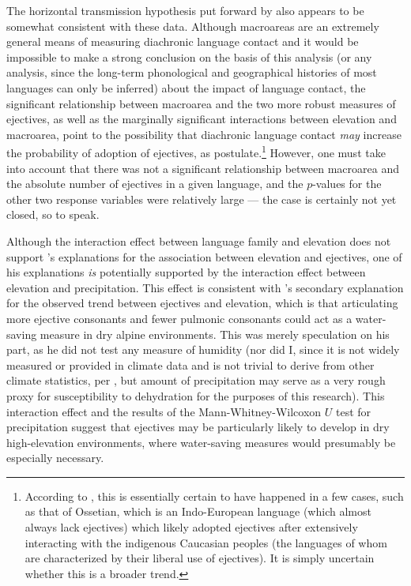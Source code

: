 \documentclass{article}
\begin{document}
The horizontal transmission hypothesis put forward by \textcite{urban2021} also appears to be somewhat consistent with these data. Although macroareas are an extremely general means of measuring diachronic language contact and it would be impossible to make a strong conclusion on the basis of this analysis (or any analysis, since the long-term phonological and geographical histories of most languages can only be inferred) about the impact of language contact, the significant relationship between macroarea and the two more robust measures of ejectives, as well as the marginally significant interactions between elevation and macroarea, point to the possibility that diachronic language contact \emph{may} increase the probability of adoption of ejectives, as \textcite{urban2021} postulate.\footnote{According to \textcite{urban2021}, this is essentially certain to have happened in a few cases, such as that of Ossetian, which is an Indo-European language (which almost always lack ejectives) which likely adopted ejectives after extensively interacting with the indigenous Caucasian peoples (the languages of whom are characterized by their liberal use of ejectives). It is simply uncertain whether this is a broader trend.} However, one must take into account that there was not a significant relationship between macroarea and the absolute number of ejectives in a given language, and the $p$-values for the other two response variables were relatively large --- the case is certainly not yet closed, so to speak. 

Although the interaction effect between language family and elevation does not support \textcite{everett2013}'s explanations for the association between elevation and ejectives, one of his explanations \emph{is} potentially supported by the interaction effect between elevation and precipitation. This effect is consistent with \textcite{everett2013}'s secondary explanation for the observed trend between ejectives and elevation, which is that articulating more ejective consonants and fewer pulmonic consonants could act as a water-saving measure in dry alpine environments. This was merely speculation on his part, as he did not test any measure of humidity (nor did I, since it is not widely measured or provided in climate data and is not trivial to derive from other climate statistics, per \cite{eccel2012}, but amount of precipitation may serve as a very rough proxy for susceptibility to dehydration for the purposes of this research). This interaction effect and the results of the Mann-Whitney-Wilcoxon $U$ test for precipitation suggest that ejectives may be particularly likely to develop in dry high-elevation environments, where water-saving measures would presumably be especially necessary.
\end{document}
